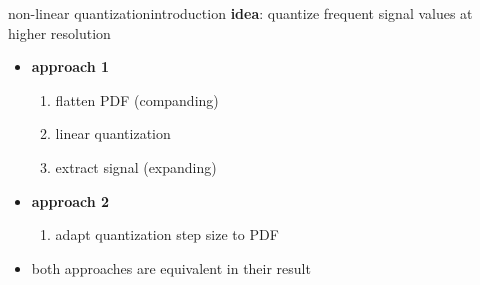 	\begin{frame}{non-linear quantization}{introduction}
		\textbf{idea}: quantize frequent signal values at higher resolution
		
		\begin{itemize}
			\item<2-> \textbf{approach 1 }	
				\begin{enumerate}
					\item	flatten PDF (companding)
					\item	linear quantization
					\item	extract signal (expanding)
				\end{enumerate}
            \item<3-> \textbf{approach 2 }	
				\begin{enumerate}
					\item	adapt quantization step size to PDF
				\end{enumerate}
            \bigskip
            \item<4->[$\Rightarrow$] both approaches are equivalent in their result
		\end{itemize}
	\end{frame}	

